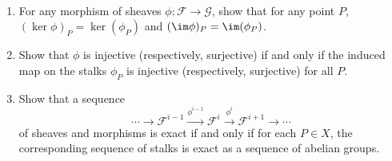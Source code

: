 \begin{exercise}%
	~
	\begin{enumerate}
		\item For any morphism of sheaves $\phi: \mathscr{F}\to \mathscr{G} $, show that for any point $P $, $(\ker \phi)_P = \ker(\phi_P) $ and $(\im \phi)_P = \im(\phi_P) $.
		\item Show that $\phi $ is injective (respectively, surjective) if and only if the induced map on the stalks $\phi_P $ is injective (respectively, surjective) for all $P $.
		\item Show that a sequence
			\[
				\cdots \to \mathscr{F}^{i-1}\xrightarrow{\phi ^{i-1}} \mathscr{F}^i \xrightarrow{\phi^i} \mathscr{F}^{i+1}\to \cdots   
			\] 
			of sheaves and morphisms is exact if and only if for each $P \in X $, the corresponding sequence of stalks is exact as a sequence of abelian groups.
	\end{enumerate}
\end{exercise}
